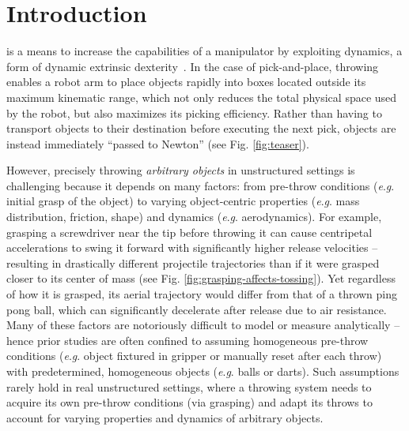 \documentclass[journal]{IEEEtran}
\newcommand{\eg}{\textit{e}.\textit{g}. }
\begin{document}
\section{Introduction}
\label{sec:introduction}

 is a means to increase the capabilities of a manipulator by exploiting dynamics, a form of dynamic extrinsic dexterity~\cite{dafle2014extrinsic}. In the case of pick-and-place, throwing enables a robot arm to place objects rapidly into boxes located outside its maximum kinematic range, which not only reduces the total physical space used by the robot, but also maximizes its picking efficiency. Rather than having to transport objects to their destination before executing the next pick, objects are instead immediately ``passed to Newton'' (see Fig. \ref{fig:teaser}).


However, precisely throwing \textit{arbitrary objects} in unstructured settings is challenging because it depends on many factors: from pre-throw conditions (\eg initial grasp of the object) to varying object-centric properties (\eg mass distribution, friction, shape) and dynamics (\eg aerodynamics). For example, grasping a screwdriver near the tip before throwing it can cause centripetal accelerations to swing it forward with significantly higher release velocities -- resulting in drastically different projectile trajectories than if it were grasped closer to its center of mass (see Fig. \ref{fig:grasping-affects-tossing}). Yet regardless of how it is grasped, its aerial trajectory would differ from that of a thrown ping pong ball, which can significantly decelerate after release due to air resistance. Many of these factors are notoriously difficult to model or measure analytically \cite{mason1993dynamic,lynch1999dynamic} -- hence prior studies are often confined to assuming homogeneous pre-throw conditions (\eg object fixtured in gripper or manually reset after each throw) with predetermined, homogeneous objects (\eg balls or darts). Such assumptions rarely hold in real unstructured settings, where a throwing system needs to acquire its own pre-throw conditions (via grasping) and adapt its throws to account for varying properties and dynamics of arbitrary objects. 
\end{document}
